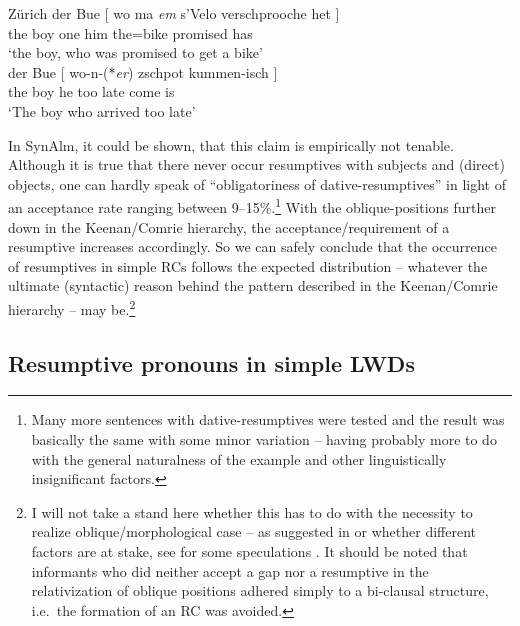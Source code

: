 \documentclass[output=paper]{langsci/langscibook}
\begin{document}
\ea\label{ex:36.13}Zürich 
    \ea
    \gll    der Bue [ wo ma \textit{em} s’Velo verschprooche het ] \\
    the boy {} \Rci{} one him the=bike promised has \\
    \glt    \enquote*{the boy, who was promised to get a bike}\\
    \ex
    \gll    der Bue [ wo-n\footnotemark-(*\textit{er}) zschpot kummen-isch ] \\
            the boy {}  {\Rci{}\hphantom{-n-(*}he}    too late come        is\\
    \glt    ‘The boy who arrived too late’
    \z
\z
{}

In SynAlm, it could be shown, that this claim is empirically not tenable.
Although it is true that there never occur resumptives with subjects and
(direct) objects, one can hardly speak of \enquote{obligatoriness of
dative-resumptives} in light of an acceptance rate ranging between
9--15\%.\footnote{Many more sentences with dative-resumptives were tested and
    the result was basically the same with some minor variation -- having
    probably more to do with the general naturalness of the example and other
linguistically insignificant factors.} With the oblique-positions further down
in the Keenan/Comrie hierarchy, the acceptance/requirement of a resumptive
increases accordingly. So we can safely conclude that the occurrence of
resumptives in simple \glspl{RC} follows the expected distribution -- whatever the
ultimate (syntactic) reason behind the pattern described in the Keenan/Comrie
hierarchy -- may be.\footnote{I will not take a stand here whether this has to
    do with the necessity to realize oblique\slash morphological
    case -- as suggested
    in \citet{Salzmann2006} or whether different factors are at stake, see for
    some speculations \textcite{BrandnerBucheli2018}. It should be noted that
    informants who did neither accept a gap nor a resumptive in the
    relativization of oblique positions adhered simply to a bi-clausal
    structure, i.e.\ the formation of an \gls{RC} was avoided.}

\subsection{Resumptive pronouns in simple LWDs}\label{sub:36.3.2} %
\end{document}
